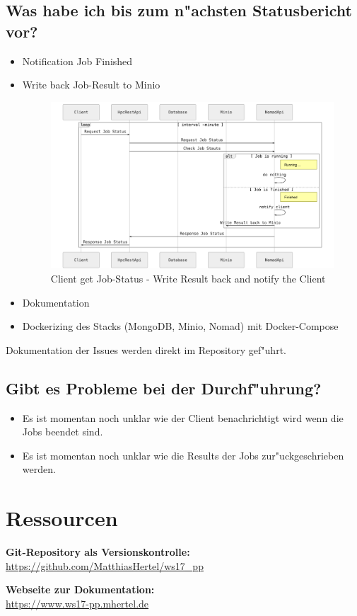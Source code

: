 \documentclass[12pt]{article}
\begin{document}
\subsection{Was habe ich bis zum n"achsten Statusbericht vor?}
\begin{itemize}
\item Notification Job Finished
\item Write back Job-Result to Minio
\begin{figure}[!htp]
	\includegraphics[width=1\textwidth]{./img/03_client-get-job-status.png}
	\captionsetup{name=Abb.,font=footnotesize}
	\caption{Client get Job-Status - Write Result back and notify the Client}
\end{figure}
\item Dokumentation
\item Dockerizing des Stacks (MongoDB, Minio, Nomad) mit Docker-Compose
\end{itemize}

Dokumentation der Issues werden direkt im Repository gef"uhrt.
\subsection{Gibt es Probleme bei der Durchf"uhrung?}
\begin{itemize}
\item Es ist momentan noch unklar wie der Client benachrichtigt wird wenn die Jobs beendet sind.
\item Es ist momentan noch unklar wie die Results der Jobs zur"uckgeschrieben werden.
\end{itemize}


\section{Ressourcen}
\textbf{Git-Repository als Versionskontrolle:}\\
\url{https://github.com/MatthiasHertel/ws17_pp}

\textbf{Webseite zur Dokumentation:}\\
\url{https://www.ws17-pp.mhertel.de}
\end{document}
